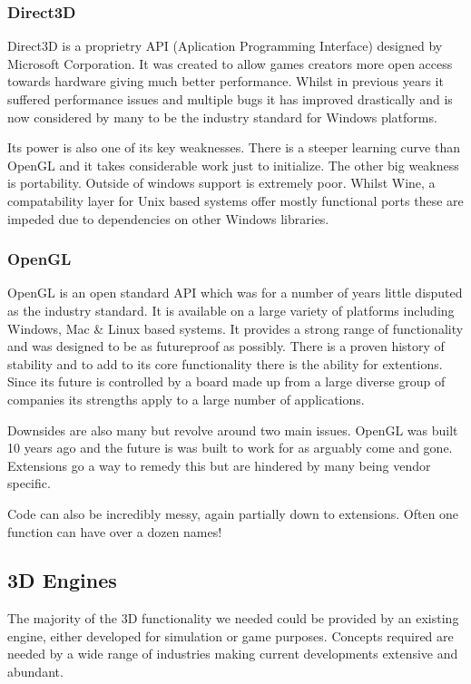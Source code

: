 \subsubsection*{Direct3D}

Direct3D is a proprietry API (Aplication Programming Interface) designed
by Microsoft Corporation. It was created to allow games creators more
open access towards hardware giving much better performance. Whilst
in previous years it suffered performance issues and multiple bugs
it has improved drastically and is now considered by many to be the
industry standard for Windows platforms\cite{Roy2002}.

Its power is also one of its key weaknesses. There is a steeper learning
curve than OpenGL and it takes considerable work just to initialize.
The other big weakness is portability. Outside of windows support
is extremely poor. Whilst Wine, a compatability layer for Unix based
systems offer mostly functional ports these are impeded due to dependencies
on other Windows libraries.


\subsubsection*{OpenGL}

OpenGL is an open standard API which was for a number of years little
disputed as the industry standard. It is available on a large variety
of platforms including Windows, Mac \& Linux based systems. It provides
a strong range of functionality and was designed to be as futureproof
as possibly. There is a proven history of stability and to add to
its core functionality there is the ability for extentions. Since
its future is controlled by a board made up from a large diverse group
of companies its strengths apply to a large number of applications.

Downsides are also many but revolve around two main issues. OpenGL
was built 10 years ago and the future is was built to work for as
arguably come and gone. Extensions go a way to remedy this but are
hindered by many being vendor specific.

Code can also be incredibly messy, again partially down to extensions.
Often one function can have over a dozen names!


\subsection*{3D Engines}

The majority of the 3D functionality we needed could be provided by
an existing engine, either developed for simulation or game purposes.
Concepts required are needed by a wide range of industries making
current developments extensive and abundant.

